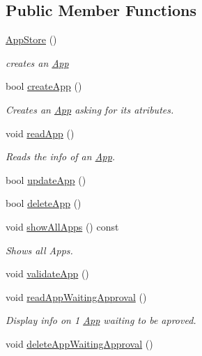 \subsection*{Public Member Functions}
\begin{DoxyCompactItemize}
\item 
\hyperlink{class_app_store_ac94669ac551c6862db7f3636fc86ae8e}{App\-Store} ()
\begin{DoxyCompactList}\small\item\em creates an \hyperlink{class_app}{App} \end{DoxyCompactList}\item 
bool \hyperlink{class_app_store_acf9313158ff9ebf261d92b51248d5929}{create\-App} ()
\begin{DoxyCompactList}\small\item\em Creates an \hyperlink{class_app}{App} asking for its atributes. \end{DoxyCompactList}\item 
void \hyperlink{class_app_store_a7e8ba8e462d02b31196055aff69b3eba}{read\-App} ()
\begin{DoxyCompactList}\small\item\em Reads the info of an \hyperlink{class_app}{App}. \end{DoxyCompactList}\item 
bool \hyperlink{class_app_store_ae2993b78d05d2418d76d22f9ced7330f}{update\-App} ()
\item 
bool \hyperlink{class_app_store_ae36a7cf8a9304a1119164bc634c7dd07}{delete\-App} ()
\item 
void \hyperlink{class_app_store_a45df3300374af488440ee24302da6186}{show\-All\-Apps} () const 
\begin{DoxyCompactList}\small\item\em Shows all Apps. \end{DoxyCompactList}\item 
void \hyperlink{class_app_store_a2de414f5e07ece6a35b71c2118355da5}{validate\-App} ()
\item 
void \hyperlink{class_app_store_ad699f59e9ebb9d187463453c21c4fa90}{read\-App\-Waiting\-Approval} ()
\begin{DoxyCompactList}\small\item\em Display info on 1 \hyperlink{class_app}{App} waiting to be aproved. \end{DoxyCompactList}\item 
void \hyperlink{class_app_store_af35d08900aea40cdf7f50949cfc0edd0}{delete\-App\-Waiting\-Approval} ()

\end{DoxyCompactItemize}
